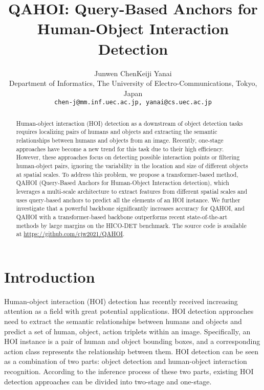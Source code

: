 \documentclass[10pt,twocolumn,letterpaper]{article}
\begin{document}
\title{QAHOI: Query-Based Anchors for Human-Object Interaction Detection}

\author{Junwen Chen\qquad Keiji Yanai\\
Department of Informatics, The University of Electro-Communications, Tokyo, Japan\\
{\tt\small chen-j@mm.inf.uec.ac.jp, yanai@cs.uec.ac.jp}
}
\maketitle

\begin{abstract}
  Human-object interaction (HOI) detection as a downstream of object detection tasks requires localizing pairs of humans and objects and extracting the semantic relationships between humans and objects from an image. 
  Recently, one-stage approaches have become a new trend for this task due to their high efficiency. 
  However, these approaches focus on detecting possible interaction points or filtering human-object pairs, ignoring the variability in the location and size of different objects at spatial scales. 
  To address this problem, we propose a transformer-based method, QAHOI (Query-Based Anchors for Human-Object Interaction detection), which leverages a multi-scale architecture to extract features from different spatial scales and uses query-based anchors to predict all the elements of an HOI instance. 
  We further investigate that a powerful backbone significantly increases accuracy for QAHOI, and QAHOI with a transformer-based backbone outperforms recent state-of-the-art methods by large margins on the HICO-DET benchmark.
  The source code is available at  
  \url{https://github.com/cjw2021/QAHOI}.
\end{abstract}

\section{Introduction}
\label{sec:intro}

Human-object interaction (HOI) detection has recently received increasing attention as a field with great potential applications.
HOI detection approaches need to extract the semantic relationships between humans and objects and predict a set of human, object, action triplets within an image.
Specifically, an HOI instance is a pair of human and object bounding boxes, and a corresponding action class represents the relationship between them.
HOI detection can be seen as a combination of two parts: object detection and human-object interaction recognition.
According to the inference process of these two parts, existing HOI detection approaches can be divided into two-stage and one-stage.
\end{document}
